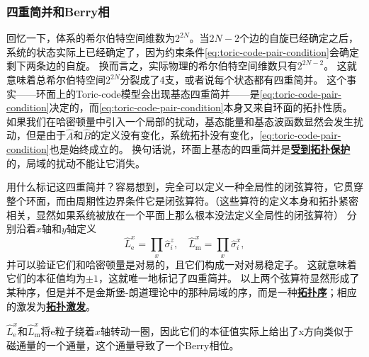 \documentclass[hyperref, UTF8, a4paper]{ctexart}
\newcommand*{\concept}[1]{\underline{\textbf{#1}}}
\begin{document}
\subsubsection{四重简并和Berry相}

回忆一下，体系的希尔伯特空间维数为$2^{2N}$。当$2N-2$个边的自旋已经确定之后，系统的状态实际上已经确定了，因为约束条件\eqref{eq:toric-code-pair-condition}会确定剩下两条边的自旋。
换而言之，实际物理的希尔伯特空间维数只有$2^{2N-2}$。
这就意味着总希尔伯特空间$2^{2N}$分裂成了4支，或者说每个状态都有四重简并。
这个事实——环面上的Toric-code模型会出现基态四重简并——是\eqref{eq:toric-code-pair-condition}决定的，而\eqref{eq:toric-code-pair-condition}本身又来自环面的拓扑性质。
如果我们在哈密顿量中引入一个局部的扰动，基态能量和基态波函数显然会发生扰动，但是由于$\hat{A}$和$\hat{B}$的定义没有变化，系统拓扑没有变化，\eqref{eq:toric-code-pair-condition}也是始终成立的。
换句话说，环面上基态的四重简并是\concept{受到拓扑保护}的，局域的扰动不能让它消失。

用什么标记这四重简并？容易想到，完全可以定义一种全局性的闭弦算符，它贯穿整个环面，而由周期性边界条件它是闭弦算符。（这些算符的定义本身和拓扑紧密相关，显然如果系统被放在一个平面上那么根本没法定义全局性的闭弦算符）
分别沿着$x$轴和$y$轴定义
\begin{equation}
    \hat{L}^x_\text{e} = \prod_{x} \hat{\sigma}^z_i, \quad \hat{L}^x_\text{m} = \prod_{x} \hat{\sigma}^x_i,
\end{equation}
并可以验证它们和哈密顿量是对易的，且它们构成一对对易稳定子。
这就意味着它们的本征值均为$\pm 1$，这就唯一地标记了四重简并。
以上两个弦算符显然形成了某种序，但是并不是金斯堡-朗道理论中的那种局域的序，而是一种\concept{拓扑序}；相应的激发为\concept{拓扑激发}。

$\hat{L}^x_\text{e}$和$\hat{L}^x_\text{m}$将e粒子绕着$x$轴转动一圈，因此它们的本征值实际上给出了x方向类似于磁通量的一个通量，这个通量导致了一个Berry相位。
\end{document}
